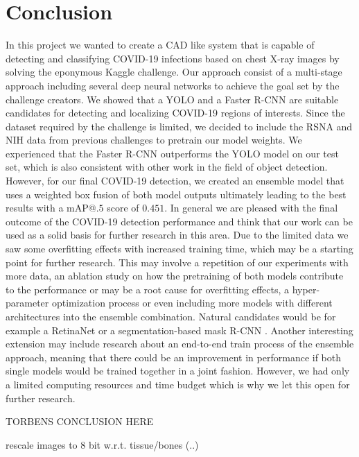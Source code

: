 \chapter{Conclusion}\label{chapter:conclusion}

In this project we wanted to create a \ac{CAD} like system that is capable of detecting and classifying COVID-19 infections based on chest X-ray images by solving the eponymous Kaggle challenge. Our approach consist of a multi-stage approach including several deep neural networks to achieve the goal set by the challenge creators. We showed that a \ac{YOLO} and a Faster \ac{R-CNN} are suitable candidates for detecting and localizing COVID-19 regions of interests. Since the dataset required by the challenge is limited, we decided to include the \ac{RSNA} and \ac{NIH} data from previous challenges to pretrain our model weights.
We experienced that the Faster \ac{R-CNN} outperforms the \ac{YOLO} model on our test set, which is also consistent with other work in the field of object detection. However, for our final COVID-19 detection, we created an ensemble model that uses a weighted box fusion of both model outputs ultimately leading to the best results with a \ac{mAP}@$.5$ score of $0.451$. In general we are pleased with the final outcome of the COVID-19 detection performance and think that our work can be used as a solid basis for further research in this area. Due to the limited data we saw some overfitting effects with increased training time, which may be a starting point for further research. This may involve a repetition of our experiments with more data, an ablation study on how the pretraining of both models contribute to the performance or may be a root cause for overfitting effects, a hyper-parameter optimization process or even including more models with different architectures into the ensemble combination. Natural candidates would be for example a RetinaNet \autocite{lin_focal_2018} or a segmentation-based mask R-CNN \autocite{maskRcnn}.
Another interesting extension may include research about an end-to-end train process of the ensemble approach, meaning that there could be an improvement in performance if both single models would be trained together in a joint fashion. However, we had only a limited computing resources and time budget which is why we let this open for further research.

TORBENS CONCLUSION HERE

rescale images to 8 bit w.r.t. tissue/bones (..)

